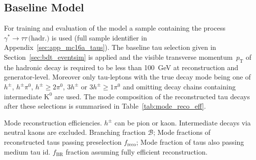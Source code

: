 \subsection{Baseline Model}
\label{sec:pfo_baseline}

For training and evaluation of the model a sample containing the process
$\gamma^* \rightarrow \tau \tau \, \text{(hadr.)}$ is used (full sample
identifier in Appendix~\ref{sec:app_mc16a_taus}). The baseline tau selection
given in Section~\ref{sec:bdt_eventsim} is applied and the visible transverse
momentum~$p_\text{T}$ of the hadronic decay is required to be less than
\SI{100}{\giga\electronvolt} at reconstruction and generator-level. Moreover
only tau-leptons with the true decay mode being one of $h^\pm$, $h^\pm \pi^0$,
$h^\pm \geq 2\pi^0$, $3h^\pm$ or $3h^\pm \geq 1\pi^0$ and omitting decay chains
containing intermediate $\text{K}^0$ are used. The mode composition of the
reconstructed tau decays after these selections is summarised in
Table~\ref{tab:mode_reco_eff}.

\begin{table}[htb]
  \centering
  
  \caption{Mode reconstruction efficiencies. $h^\pm$ can be pion or kaon.
    Intermediate decays via neutral kaons are excluded. Branching fraction
    $\mathcal{B}$; Mode fractions of reconstructed taus passing preselection
    $f_\text{reco}$; Mode fraction of taus also passing medium tau id.
    $f_\text{BR}$ fraction assuming fully efficient reconstruction.}
  \label{tab:mode_reco_eff}
\end{table}

